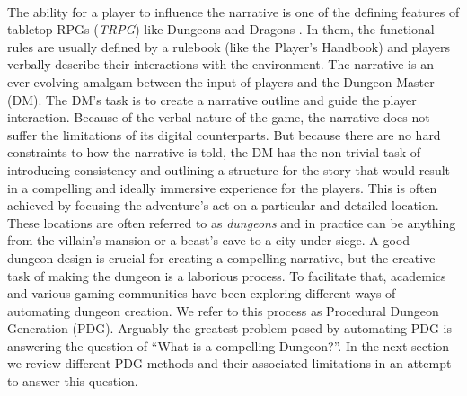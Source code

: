 \documentclass{UoYCSproject}
\begin{document}
\paragraph{}
The ability for a player to influence the narrative is one of the defining features of tabletop RPGs (\textit{TRPG}) like Dungeons and Dragons \parencite{DnD}. In them, the functional rules are usually defined by a rulebook (like the Player’s Handbook) and players verbally describe their interactions with the environment. The narrative is an ever evolving amalgam between the input of players and the Dungeon Master (DM). The DM’s task is to create a narrative outline and guide the player interaction. Because of the verbal nature of the game, the narrative does not suffer the limitations of its digital counterparts. But because there are no hard constraints to how the narrative is told, the DM has the non-trivial task of introducing consistency and outlining a structure for the story that would result in a compelling and ideally immersive experience for the players. This is often achieved by focusing the adventure’s act on a particular and detailed location. These locations are often referred to as \textit{dungeons} and in practice can be anything from the villain's mansion or a beast’s cave to a city under siege. A good dungeon design is crucial for creating a compelling narrative, but the creative task of making the dungeon is a laborious process. To facilitate that, academics and various gaming communities have been exploring different ways of automating dungeon creation. We refer to this process as Procedural Dungeon Generation (PDG). Arguably the greatest problem posed by automating PDG is answering the question of “What is a compelling Dungeon?”. In the next section we review different PDG methods and their associated limitations in an attempt to answer this question.
\end{document}
